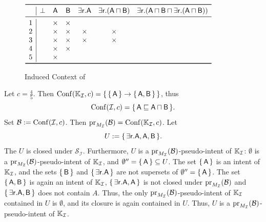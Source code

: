 \begin{Example}
  \begin{figure}[tp]
    \centering
    \begin{math}
      \begin{array}{c|*{6}{c}}
        \toprule
        ~ & \bot & \mathsf{A} & \mathsf{B} & \mathsf{\exists r. A} & \mathsf{\exists r. (A
          \sqcap B)} & \mathsf{\exists r. (A \sqcap B \sqcap \exists r. (A \sqcap B))} \\
        \midrule
        1 & & \times & \times \\
        2 & & \times & \times & \times & \times \\
        3 & & \times & \times & \times & \times \\
        4 & & \times & \times \\
        5 & & \times  \\
        \bottomrule
      \end{array}
    \end{math}
    \caption{Induced Context of }
    \label{fig:no-minimality-induced-context}
  \end{figure}

  Let $c = \frac 4 5$.  Then $\operatorname{Conf}({\mathbb{K}}_{\mathcal{I}}, c) = {\{\, {\{\, \mathsf{A} \,\}}
    \to {\ensuremath{\{\, \mathsf{A}, \mathsf{B} \,\}}} \,\}}$, thus
  \begin{equation*}
    \operatorname{Conf}(\mathcal{I}, c) = {\{\, \mathsf{A} \sqsubseteq \mathsf{A \sqcap B} \,\}}.
  \end{equation*}
  Set $\mathcal{B} := \operatorname{Conf}(\mathcal{I}, c)$.  Then $\operatorname{pr}_{M_{\mathcal{I}}}(\mathcal{B}) =
  \operatorname{Conf}({\mathbb{K}}_{\mathcal{I}}, c)$.  Let
  \begin{equation*}
    U := {\{\, \mathsf{\exists r. A}, \mathsf{A}, \mathsf{B} \,\}}.
  \end{equation*}
  The $U$ is closed under $\mathcal{S}_{\mathcal{I}}$.  Furthermore, $U$ is a
  $\operatorname{pr}_{M_{\mathcal{I}}}(\mathcal{B})$-pseudo-intent of ${\mathbb{K}}_{\mathcal{I}}$:
  $\emptyset$ is a $\operatorname{pr}_{M_{\mathcal{I}}}(\mathcal{B})$-pseudo-intent of ${\mathbb{K}}_{\mathcal{I}}$, and $\emptyset'' = {\{\, \mathsf{A} \,\}} \subseteq U$.  The set ${\{\,
    \mathsf{A} \,\}}$ is an intent of ${\mathbb{K}}_{\mathcal{I}}$, and the sets ${\{\, \mathsf{B}
  \,\}}$ and ${\{\, \mathsf{\exists r. A} \,\}}$ are not supersets of $\emptyset'' = {\{\,
    \mathsf{A} \,\}}$.  The set ${\{\, \mathsf{A}, \mathsf{B} \,\}}$ is again an intent of ${\mathbb{K}}_{\mathcal{I}}$, ${\{\, \mathsf{\exists r. A}, \mathsf{A} \,\}}$ is not closed under
  $\operatorname{pr}_{M_{\mathcal{I}}}(\mathcal{B})$ and ${\{\, \mathsf{\exists r. A}, \mathsf{B} \,\}}$
  does not contain $A$.  Thus, the only $\operatorname{pr}_{M_{\mathcal{I}}}(\mathcal{B})$-pseudo-intent
  of ${\mathbb{K}}_{\mathcal{I}}$ contained in $U$ is $\emptyset$, and its closure is again
  contained in $U$.  Thus, $U$ is a $\operatorname{pr}_{M_{\mathcal{I}}}(\mathcal{B})$-pseudo-intent of
  ${\mathbb{K}}_{\mathcal{I}}$.


\end{Example}
